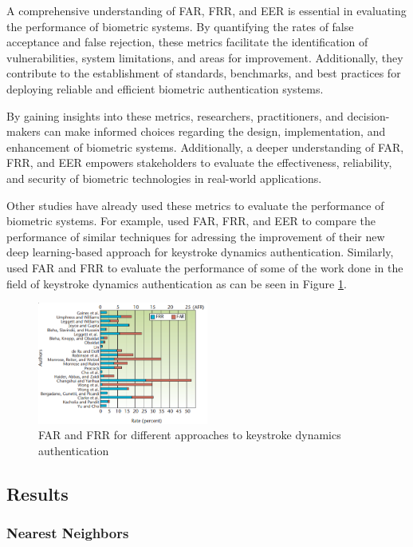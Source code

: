 A comprehensive understanding of FAR, FRR, and EER is essential in evaluating the performance of biometric systems. By quantifying the rates of false acceptance and false rejection, these metrics facilitate the identification of vulnerabilities, system limitations, and areas for improvement. Additionally, they contribute to the establishment of standards, benchmarks, and best practices for deploying reliable and efficient biometric authentication systems.

By gaining insights into these metrics, researchers, practitioners, and decision-makers can make informed choices regarding the design, implementation, and enhancement of biometric systems. Additionally, a deeper understanding of FAR, FRR, and EER empowers stakeholders to evaluate the effectiveness, reliability, and security of biometric technologies in real-world applications.

Other studies have already used these metrics to evaluate the performance of biometric systems. For example, \cite{deep_learning} used FAR, FRR, and EER to compare the performance of similar techniques for adressing the improvement of their new deep learning-based approach for keystroke dynamics authentication. Similarly, \cite{typing_patterns} used FAR and FRR to evaluate the performance of some of the work done in the field of keystroke dynamics authentication as can be seen in Figure \ref{fig:far_frr}.

\begin{figure}
    \centering
    \includegraphics[width=0.5\textwidth]{images/studies.png}
    \caption{FAR and FRR for different approaches to keystroke dynamics authentication \cite{typing_patterns}}
    \label{fig:far_frr}
\end{figure}

\subsection{Results}

\subsubsection{Nearest Neighbors}

